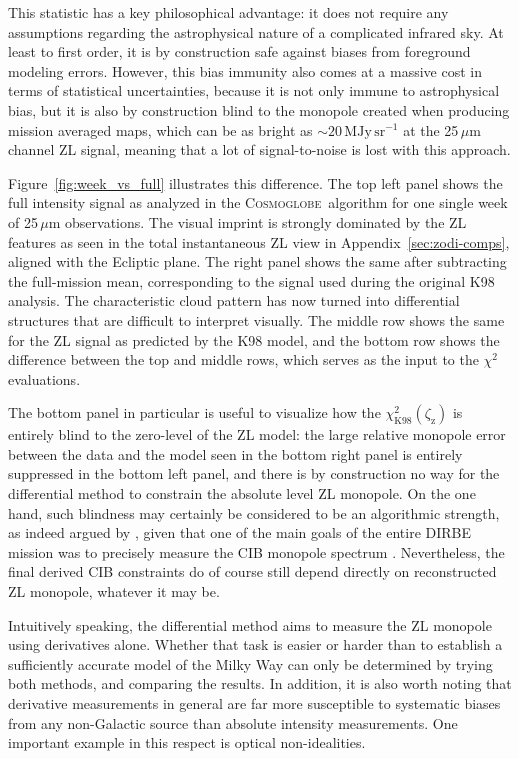 \documentclass[twocolumn]{aa}
\newcommand{\cosmoglobe}{\textsc{Cosmoglobe}}
\begin{document}
This statistic has a key philosophical advantage: it does
not require any assumptions regarding the astrophysical nature of a 
complicated infrared sky. At least to first order, it is by
construction safe against biases from foreground modeling
errors. However, this bias immunity also comes at a massive cost in
terms of statistical uncertainties, because it is not only immune to
astrophysical bias, but it is also by construction blind to the monopole 
created when producing mission averaged maps, which can be as bright as 
$\sim\mathrm{20\,MJy\,sr^{-1}}$ at the 25$\,\mu$m channel ZL signal, meaning that a lot of 
signal-to-noise is lost with this approach.

Figure~\ref{fig:week_vs_full} illustrates this difference. The top
left panel shows the full intensity signal as analyzed in the
\cosmoglobe\ algorithm for one single week of 25\,$\mu$m
observations. The visual imprint is strongly dominated by the ZL
features as seen in the total instantaneous ZL view in Appendix~\ref{sec:zodi-comps}, aligned with the Ecliptic
plane. The right panel shows the same after subtracting the
full-mission mean, corresponding to the signal used during 
the original K98 analysis. The characteristic cloud pattern has now turned
into differential structures that are difficult to interpret
visually. The middle row shows the same for the ZL signal as predicted by the K98 model,
and the bottom row shows the difference between the top and middle
rows, which serves as the input to the $\chi^2$ evaluations.


The bottom panel in particular is useful to visualize 
how the $\chi^2_{\mathrm{K98}}(\zeta_{\mathrm{z}})$
is entirely blind to the
zero-level of the ZL model: the large relative monopole error between
the data and the model seen in the bottom right panel is entirely
suppressed in the bottom left panel, and there is by construction no
way for the differential method to constrain the absolute level ZL
monopole. On the one hand, such blindness may certainly be considered
to be an algorithmic strength, as indeed argued by
\citet{kelsall1998}, given that one of the main goals of the entire
DIRBE mission was to precisely measure the CIB monopole spectrum
\citep{hauser1998}. Nevertheless, the final derived CIB constraints do
of course still depend directly on reconstructed ZL monopole, whatever
it may be. 

Intuitively speaking, the differential method aims to
measure the ZL monopole using derivatives alone. Whether that task is
easier or harder than to establish a sufficiently accurate model of
the Milky Way can only be determined by trying both methods, and
comparing the results. In addition, it is also worth noting that
derivative measurements in general are far more susceptible to
systematic biases from any non-Galactic source than absolute intensity
measurements. One important example in this respect is optical
non-idealities.
\end{document}
